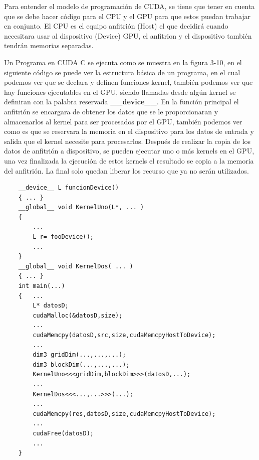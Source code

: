 Para entender el modelo de programación de CUDA, se tiene que tener en cuenta que se debe hacer código para el CPU y el GPU para que estos puedan trabajar en conjunto. El CPU es el equipo anfitrión (Host) el que decidirá cuando necesitara usar al dispositivo (Device) GPU, el anfitrion y el dispositivo también tendrán memorias separadas. 

Un Programa en CUDA C se ejecuta como se muestra en la figura 3-10, en el siguiente código se puede ver la estructura básica de un programa, en el cual podemos ver que se declara y definen funciones kernel, también podemos ver que hay funciones ejecutables en el GPU, siendo llamadas desde algún kernel se definiran con la palabra reservada \textbf{\_\_device\_\_}.
En la función principal el anfitrión se encargara de obtener los datos que se le proporcionaran y almacenarlos al kernel para ser procesados por el  GPU, también podemos ver como es que se reservara la memoria en el dispositivo para los datos de entrada y salida que el kernel necesite para procesarlos.
Después de realizar la copia de los datos de anfitrión a dispositivo, se pueden ejecutar uno o más kernels en el GPU, una vez finalizada la ejecución de estos kernels el resultado se copia a la memoria del anfitrión. La final solo quedan liberar los recurso que ya no serán utilizados. 

\begin{lstlisting}
	__device__ L funcionDevice()
	{ ... }	
	__global__ void KernelUno(L*, ... )
    {
    	...
   		L r= fooDevice();
   		...
    }
    __global__ void KernelDos( ... )
    { ... }    
    int main(...)
	{	...
		L* datosD;
		cudaMalloc(&datosD,size);
		...		
		cudaMemcpy(datosD,src,size,cudaMemcpyHostToDevice);		
		...	
		dim3 gridDim(...,...,...);
		dim3 blockDim(...,...,...);
		KernelUno<<<gridDim,blockDim>>>(datosD,...);	
		...
		KernelDos<<<...,...>>>(...);
		...
		cudaMemcpy(res,datosD,size,cudaMemcpyHostToDevice);
		...
		cudaFree(datosD);
		...			
	}
\end{lstlisting}




  







